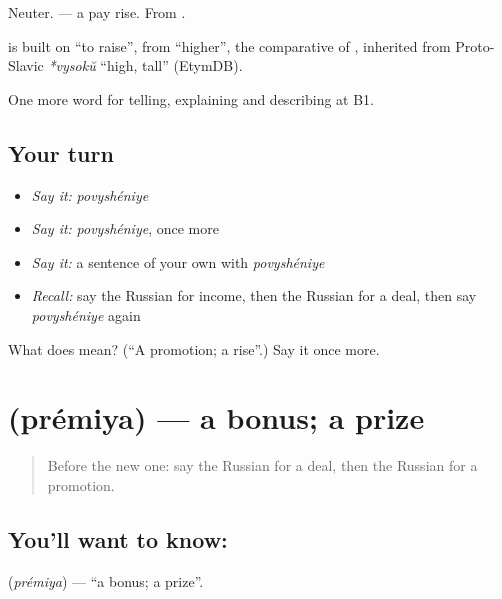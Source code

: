 Neuter. \emph{ } — a pay rise. From \emph{}.

\begin{cousinweb}
\textbf{} is built on \emph{} \textquotedblleft{}to raise\textquotedblright{}, from \emph{} \textquotedblleft{}higher\textquotedblright{}, the comparative of \emph{}, inherited from Proto-Slavic \emph{*vysokŭ} \textquotedblleft{}high, tall\textquotedblright{} (EtymDB).
\end{cousinweb}

\begin{grammarlens}[title={What you've built}]
One more word for telling, explaining and describing at B1.
\end{grammarlens}

\subsection*{Your turn}
\begin{itemize}
\raggedright
  \item \emph{Say it:} \emph{povyshéniye}
  \item \emph{Say it:} \emph{povyshéniye}, once more
  \item \emph{Say it:} a sentence of your own with \emph{povyshéniye}
  \item \emph{Recall:} say the Russian for income, then the Russian for a deal, then say \emph{povyshéniye} again
\end{itemize}

\begin{tcolorbox}[breakable,colback=teal!4,colframe=teal!35!black,title={Before you move on}]
What does  mean? (\textquotedblleft{}A promotion; a rise\textquotedblright{}.) Say it once more.
\end{tcolorbox}
\section[\texorpdfstring{\ru{премия} (prémiya)}{премия (prémiya)}]{ (prémiya) — a bonus; a prize}

\label{lesson:RU-C362-premiya}



\begin{quote}
Before the new one: say the Russian for a deal, then the Russian for a promotion.
\end{quote}

\subsection*{You'll want to know: }
\textbf{} (\emph{prémiya}) — \textquotedblleft{}a bonus; a prize\textquotedblright{}.

